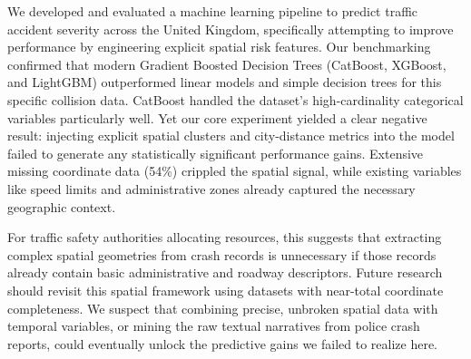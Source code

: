 \documentclass[runningheads]{llncs}
\begin{document}
We developed and evaluated a machine learning pipeline to predict traffic accident severity across the United Kingdom, specifically attempting to improve performance by engineering explicit spatial risk features. Our benchmarking confirmed that modern Gradient Boosted Decision Trees (CatBoost, XGBoost, and LightGBM) outperformed linear models and simple decision trees for this specific collision data. CatBoost handled the dataset's high-cardinality categorical variables particularly well. Yet our core experiment yielded a clear negative result: injecting explicit spatial clusters and city-distance metrics into the model failed to generate any statistically significant performance gains. Extensive missing coordinate data (54\%) crippled the spatial signal, while existing variables like speed limits and administrative zones already captured the necessary geographic context.

For traffic safety authorities allocating resources, this suggests that extracting complex spatial geometries from crash records is unnecessary if those records already contain basic administrative and roadway descriptors. Future research should revisit this spatial framework using datasets with near-total coordinate completeness. We suspect that combining precise, unbroken spatial data with temporal variables, or mining the raw textual narratives from police crash reports, could eventually unlock the predictive gains we failed to realize here.
\end{document}
